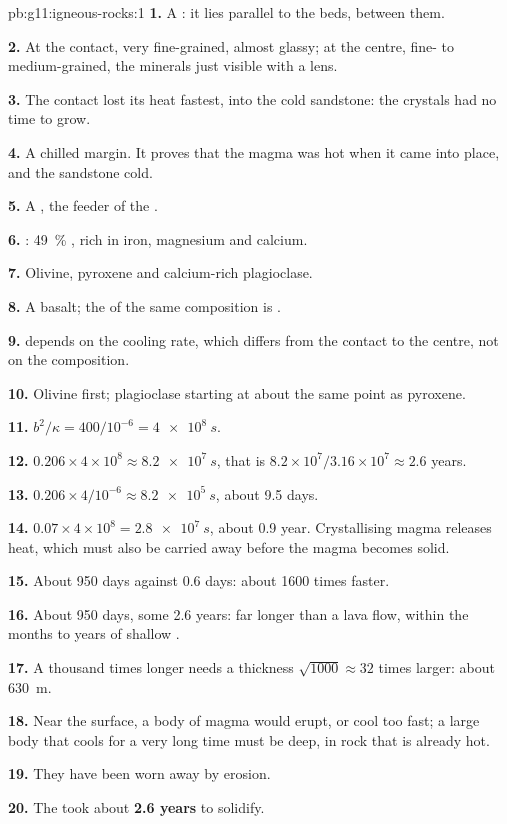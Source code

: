 \begin{solution}{pb:g11:igneous-rocks:1}
\textbf{1.} A : it lies parallel to the beds, between them.

\textbf{2.} At the contact, very fine-grained, almost glassy; at the centre,
fine- to medium-grained, the minerals just visible with a lens.

\textbf{3.} The contact lost its heat fastest, into the cold sandstone: the
crystals had no time to grow.

\textbf{4.} A chilled margin. It proves that the magma was hot when it came
into place, and the sandstone cold.

\textbf{5.} A , the feeder of the .

\textbf{6.} : \qty{49}{\percent} , rich in iron, magnesium and
calcium.

\textbf{7.} Olivine, pyroxene and calcium-rich plagioclase.

\textbf{8.} A basalt; the  of the same composition is .

\textbf{9.}  depends on the cooling rate, which differs from the
contact to the centre, not on the composition.

\textbf{10.} Olivine first; plagioclase starting at about the same point as
pyroxene.

\textbf{11.} $b^2/\kappa = 400/10^{-6} = \qty{4e8}{s}$.

\textbf{12.} $0.206 \times 4 \times 10^8 \approx \qty{8.2e7}{s}$, that is
$8.2 \times 10^7 / 3.16 \times 10^7 \approx 2.6$ years.

\textbf{13.} $0.206 \times 4/10^{-6} \approx \qty{8.2e5}{s}$, about 9.5
days.

\textbf{14.} $0.07 \times 4 \times 10^8 = \qty{2.8e7}{s}$, about 0.9 year.
Crystallising magma releases heat, which must also be carried away before
the magma becomes solid.

\textbf{15.} About 950 days against 0.6 days: about 1600 times faster.

\textbf{16.} About 950 days, some 2.6 years: far longer than a lava flow,
within the months to years of shallow .

\textbf{17.} A thousand times longer needs a thickness $\sqrt{1000} \approx
32$ times larger: about \qty{630}{m}.

\textbf{18.} Near the surface, a body of magma would erupt, or cool too fast;
a large body that cools for a very long time must be deep, in rock that is
already hot.

\textbf{19.} They have been worn away by erosion.

\textbf{20.} The  took about \textbf{2.6 years} to solidify.
\end{solution}
